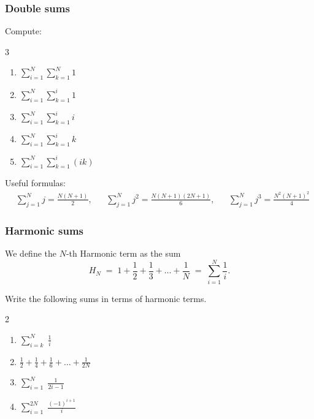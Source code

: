 \begin{frame}[t]
	\frametitle{Double sums}

	Compute:
	\begin{multicols}{3}
		\begin{enumerate}
			\item $\displaystyle \sum_{i=1}^{N}\sum_{k=1}^{N}1$

			\item $\displaystyle \sum_{i=1}^{N}\sum_{k=1}^{i}1$

			\item $\displaystyle \sum_{i=1}^{N}\sum_{k=1}^{i}i$

			\item $\displaystyle \sum_{i=1}^{N}\sum_{k=1}^{i}k$

			\item $\displaystyle \sum_{i=1}^{N}\sum_{k=1}^{i}(ik)$
		\end{enumerate}
	\end{multicols}

	\vfill

	{\fontsize{10}{10}\selectfont Useful formulas: \begin{align*}&\sum_{j=1}^{N}j = \frac{N(N+1)}{2},&&\sum_{j=1}^{N}j^{2}= \frac{N(N+1)(2N+1)}{6},&&\sum_{j=1}^{N}j^{3}= \frac{N^{2}(N+1)^{2}}{4}\end{align*} }
\end{frame}

\begin{frame}[t]
	\fontsize{13}{13}\selectfont
	\frametitle{Harmonic sums}

	We define the $N$-th Harmonic term as the sum
	\[
		H_{N}\; = \; 1 + \frac{1}{2}+ \frac{1}{3}+ \ldots + \frac{1}{N}\; = \; \sum_{i=1}
		^{N}\frac{1}{i}.
	\]

	Write the following sums in terms of harmonic terms.

	\begin{multicols}{2}
		\begin{enumerate}
			\item $\displaystyle \sum_{i=k}^{N}\; \frac{1}{i}$

			\item $\displaystyle \frac{1}{2}+ \frac{1}{4}+ \frac{1}{6}+ \ldots + \frac{1}{2N}$

			\item $\displaystyle \sum_{i=1}^{N}\; \frac{1}{2i-1}$

			\item $\displaystyle \sum_{i=1}^{2N}\; \frac{(-1)^{i+1}}{i}$
		\end{enumerate}
	\end{multicols}
\end{frame}

